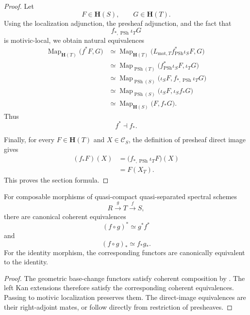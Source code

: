 \begin{proof}
Let
\[
    F
    \in
    \mathbf H(S),
    \qquad
    G
    \in
    \mathbf H(T).
\]
Using the localization adjunction, the presheaf adjunction, and the
fact that
\[
    f_{*,\operatorname{PSh}}\iota_TG
\]
is motivic-local, we obtain natural equivalences
\[
\begin{aligned}
    \operatorname{Map}_{\mathbf H(T)}
    \bigl(
        f^*F,
        G
    \bigr)
    &\simeq
    \operatorname{Map}_{\mathbf H(T)}
    \bigl(
        L_{\mathrm{mot},T}
        f^*_{\operatorname{PSh}}\iota_SF,
        G
    \bigr)
    \\
    &\simeq
    \operatorname{Map}_{\operatorname{PSh}(T)}
    \bigl(
        f^*_{\operatorname{PSh}}\iota_SF,
        \iota_TG
    \bigr)
    \\
    &\simeq
    \operatorname{Map}_{\operatorname{PSh}(S)}
    \bigl(
        \iota_SF,
        f_{*,\operatorname{PSh}}\iota_TG
    \bigr)
    \\
    &\simeq
    \operatorname{Map}_{\operatorname{PSh}(S)}
    \bigl(
        \iota_SF,
        \iota_Sf_*G
    \bigr)
    \\
    &\simeq
    \operatorname{Map}_{\mathbf H(S)}
    \bigl(
        F,
        f_*G
    \bigr).
\end{aligned}
\]
Thus
\[
    f^*
    \dashv
    f_*.
\]

Finally, for every \(F\in\mathbf H(T)\) and
\(X\in\mathcal C_S\), the definition of presheaf direct image gives
\[
\begin{aligned}
    (f_*F)(X)
    &=
    \bigl(
        f_{*,\operatorname{PSh}}\iota_TF
    \bigr)(X)
    \\
    &=
    F(X_T).
\end{aligned}
\]
This proves the section formula.
\end{proof}

\begin{proposition}
\label{prop:motivic-coherent-base-functoriality}
For composable morphisms of quasi-compact quasi-separated spectral
schemes
\[
    R
    \xrightarrow{g}
    T
    \xrightarrow{f}
    S,
\]
there are canonical coherent equivalences
\[
    (f\circ g)^*
    \simeq
    g^*f^*
\]
and
\[
    (f\circ g)_*
    \simeq
    f_*g_*.
\]
For the identity morphism, the corresponding functors are canonically
equivalent to the identity.
\end{proposition}

\begin{proof}
The geometric base-change functors satisfy coherent composition by
.  The left Kan extensions
therefore satisfy the corresponding coherent equivalences.  Passing to
motivic localization preserves them.  The direct-image equivalences are
their right-adjoint mates, or follow directly from restriction of
presheaves.
\end{proof}

